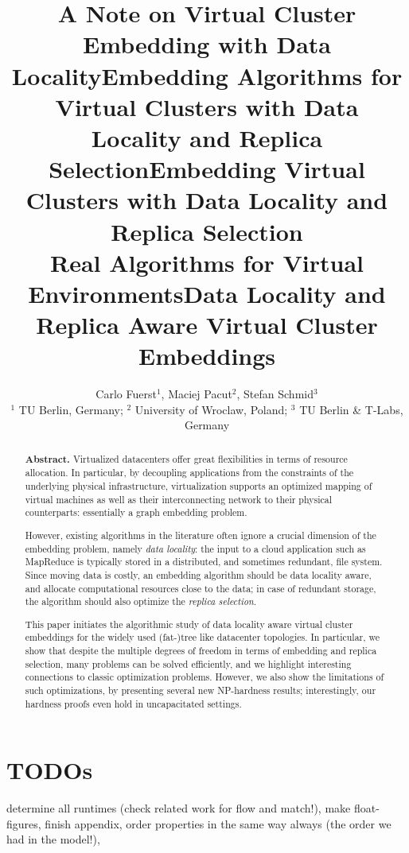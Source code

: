 \documentclass[9pt]{sigcomm-alternate}
\title{A Note on Virtual Cluster Embedding with Data Locality}
\title{Embedding Algorithms for Virtual Clusters with Data Locality and Replica Selection}
\title{Embedding Virtual Clusters with Data Locality and Replica Selection\\{\Large Real Algorithms for Virtual Environments}}
\title{Data Locality and Replica Aware Virtual Cluster Embeddings}
\author{Carlo Fuerst$^1$, Maciej Pacut$^2$, Stefan Schmid$^3$\\
{\small $^1$ TU Berlin, Germany; $^2$ University of Wroclaw, Poland; $^3$ TU Berlin \& T-Labs, Germany}}
\begin{document}
\maketitle


\begin{abstract}
\textbf{Abstract.} Virtualized datacenters offer great flexibilities in terms of resource allocation. In particular, by
decoupling applications from the constraints of the underlying physical infrastructure, virtualization
supports an optimized mapping of virtual machines as well as their interconnecting network
to their
physical counterparts: essentially a graph embedding problem.

However, existing algorithms
in the literature often ignore a crucial dimension of the embedding problem, namely \emph{data locality}:
the input to a cloud application such as MapReduce is typically stored in a distributed,
and sometimes redundant, file system. Since moving
data is costly, an embedding algorithm should be data locality aware,
and allocate computational resources close to the data; in case of redundant storage, the algorithm should also optimize the \emph{replica selection}.

This paper initiates the algorithmic study of data locality aware virtual cluster embeddings for
the widely used (fat-)tree like datacenter topologies.
In particular, we
show that
despite the multiple degrees of freedom in terms of embedding and replica selection,
many problems can be
solved efficiently, and we highlight interesting connections
to classic optimization problems. However, we also show the limitations of such optimizations,
by presenting several new NP-hardness results; interestingly,
our hardness proofs even hold in uncapacitated settings.
\end{abstract}

\section*{TODOs}

determine all runtimes (check related work for flow and match!), make float-figures, finish appendix, order properties in the same way always (the order we had in the model!),
\end{document}
